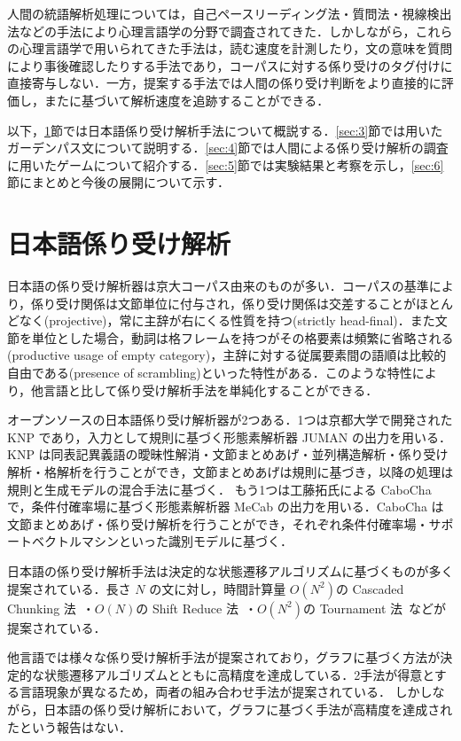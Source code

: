 \documentclass[japanese]{jnlp_1.4}
\def\modified#1{}
\begin{document}
人間の統語解析処理については，自己ペースリーディング法・質問法・視線検出法などの手法により心理言語学の分野で調査されてきた\cite{Mazuka1997a,Tokimoto04}．しかしながら，これらの心理言語学で用いられてきた手法は，読む速度を計測したり，文の意味を質問により事後確認したりする手法であり，コーパスに対する係り受けのタグ付けに直接寄与しない．一方，提案する手法では人間の係り受け判断をより直接的に評価し，また\modified{体重加重分布}に基づいて解析速度を追跡することができる．

以下，\ref{sec:2}節では日本語係り受け解析手法について概説する．\ref{sec:3}節では用いたガーデンパス文について説明する．\ref{sec:4}節では人間による係り受け解析の調査に用いたゲームについて紹介する．\ref{sec:5}節では実験結果と考察を示し，\ref{sec:6}節にまとめと今後の展開について示す．



\section{日本語係り受け解析} \label{sec:2}

日本語の係り受け解析器は京大コーパス由来のものが多い．コーパスの基準により，係り受け関係は文節単位に付与され，係り受け関係は交差することがほとんどなく(projective)，常に主辞が右にくる性質を持つ(strictly head-final)．また文節を単位とした場合，動詞は格フレームを持つがその格要素は頻繁に省略される(productive usage of empty category)，主辞に対する従属要素間の語順は比較的自由である(presence of scrambling)といった特性がある．このような特性により，他言語と比して係り受け解析手法を単純化することができる．

オープンソースの日本語係り受け解析器が2つある．1つは京都大学で開発された KNP であり，入力として規則に基づく形態素解析器 JUMAN の出力を用いる．KNP は同表記異義語の曖昧性解消・文節まとめあげ・並列構造解析・係り受け解析・格解析を行うことができ，文節まとめあげは規則に基づき，以降の処理は規則と生成モデルの混合手法に基づく．
もう1つは工藤拓氏による CaboCha で，条件付確率場に基づく形態素解析器 MeCab の出力を用いる．CaboCha は文節まとめあげ・係り受け解析を行うことができ，それぞれ条件付確率場・サポートベクトルマシンといった識別モデルに基づく．

日本語の係り受け解析手法は決定的な状態遷移アルゴリズムに基づくものが多く提案されている．長さ $N$ の文に対し，時間計算量 $O(N^2)$の Cascaded Chunking 法~\cite{Kudo02}・$O(N)$の Shift Reduce 法~\cite{Sassano04}・$O(N^2)$の Tournament 法~\cite{Iwatate08}などが提案されている．

他言語では様々な係り受け解析手法が提案されており\cite{CoNLL06,CoNLL07}，グラフに基づく方法\cite{Eisner00,McDonald05,Carreras07,Koo10}が決定的な状態遷移アルゴリズム\cite{Nivre03,Nivre04}とともに高精度を達成している．2手法が得意とする言語現象が異なるため，両者の組み合わせ手法\cite{Nivre08}が提案されている．
しかしながら，日本語の係り受け解析において，グラフに基づく手法が高精度を達成されたという報告はない．
\end{document}
